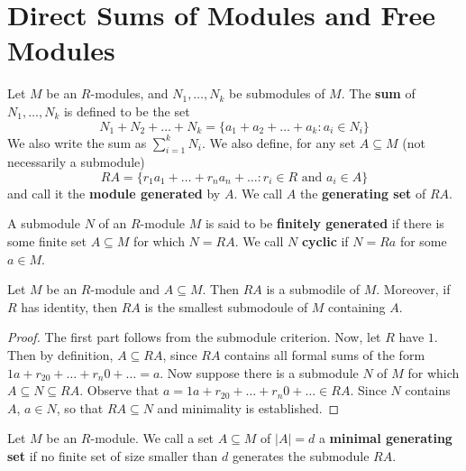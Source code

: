\section{Direct Sums of Modules and Free Modules}

\begin{definition}
  Let $M$ be an  $R$-modules, and  $N_1, \dots, N_k$ be submodules of
  $M$. The  \textbf{sum} of $N_1, \dots, N_k$ is defined to be the set
  \begin{equation*}
    N_1+N_2+\dots+N_k=
    \{ a_1+a_2+\dots+a_k : a_i \in N_i \}
  \end{equation*}
  We also write the sum as $\sum_{i=1}^k{N_i}$.
  We also define, for any set $A \subseteq M$ (not necessarily a
  submodule)
  \begin{equation*}
    RA=
    \{ r_1a_1+\dots+r_na_n+\dots : r_i \in R \text{ and } a_i \in A \}
  \end{equation*}
  and call it the \textbf{module generated} by $A$. We call  $A$ the
  \textbf{generating set} of $RA$.
\end{definition}

\begin{definition}
  A submodule $N$ of an  $R$-module  $M$ is said to be
  \textbf{finitely generated} if there is some finite set $A \subseteq
  M$ for which $N=RA$. We call $N$ \textbf{cyclic} if $N=Ra$ for some
  $a \in M$.
\end{definition}

\begin{proposition}\label{proposition_4.4.1}
  Let $M$ be an  $R$-module and  $A \subseteq M$. Then $RA$ is a
  submodile of  $M$. Moreover, if  $R$ has identity, then  $RA$ is the
  smallest submodoule of  $M$ containing  $A$.
\end{proposition}
\begin{proof}
  The first part follows from the submodule criterion. Now, let $R$
  have  $1$. Then by definition, $A \subseteq RA$, since $RA$
  contains all formal sums of the form  $1a+r_20+\dots+r_n0+\dots=a$.
  Now suppose there is a submodule $N$ of  $M$ for which  $A \subseteq
  N \subseteq RA$. Observe that $a=1a+r_20+\dots+r_n0+\dots \in RA$.
  Since $N$ contains $A$, $a \in N$, so that $RA \subseteq N$ and
  minimality is established.
\end{proof}

\begin{definition}
  Let $M$ be an $R$-module. We call a set $A \subseteq M$ of $|A|=d$ a
  \textbf{minimal generating set} if no finite set of size smaller
  than $d$ generates the submodule $RA$.
\end{definition}

